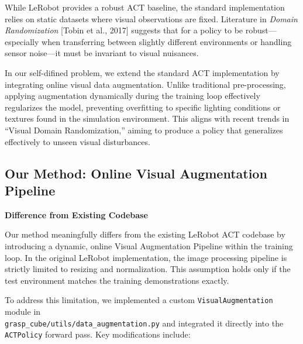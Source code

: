 \documentclass[10pt]{article} %
\begin{document}
While LeRobot provides a robust ACT baseline, the standard implementation relies on static datasets where visual observations are fixed. Literature in \textit{Domain Randomization} [Tobin et al., 2017] suggests that for a policy to be robust—especially when transferring between slightly different environments or handling sensor noise—it must be invariant to visual nuisances. 

In our self-difined problem, we extend the standard ACT implementation by integrating online visual data augmentation. Unlike traditional pre-processing, applying augmentation dynamically during the training loop effectively regularizes the model, preventing overfitting to specific lighting conditions or textures found in the simulation environment. This aligns with recent trends in ``Visual Domain Randomization,'' aiming to produce a policy that generalizes effectively to unseen visual disturbances.

\subsection{Our Method: Online Visual Augmentation Pipeline}
\label{sec:method_augmentation}

\textbf{Difference from Existing Codebase}

Our method meaningfully differs from the existing LeRobot ACT codebase by introducing a dynamic, online Visual Augmentation Pipeline within the training loop. In the original LeRobot implementation, the image processing pipeline is strictly limited to resizing and normalization. This assumption holds only if the test environment matches the training demonstrations exactly.

To address this limitation, we implemented a custom \texttt{VisualAugmentation} module in \\
\texttt{grasp\_cube/utils/data\_augmentation.py} and integrated it directly into the \texttt{ACTPolicy} forward pass. Key modifications include:
\end{document}
